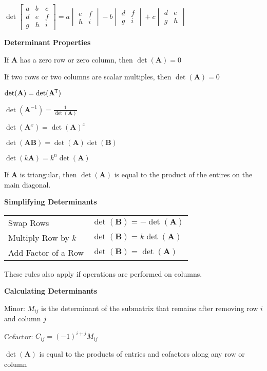 \documentclass[10pt]{article}
\newcommand{\matr}[1]{\mathbf{#1}}
\newcommand{\tran}{^{\mkern-1.5mu\mathsf{T}}}
\newcommand{\inv}{^{-1}}
\newcommand\heading[1]{\medskip\textbf{#1}\medskip}
\begin{document}
\begin{multicols*}{3}
$\det\begin{bmatrix}
    a & b & c \\
    d & e & f \\
    g & h & i
\end{bmatrix} = a\begin{vmatrix}
    e & f \\ 
    h & i
\end{vmatrix} - b\begin{vmatrix}
    d & f \\
    g & i
\end{vmatrix} + c\begin{vmatrix}
    d & e \\
    g & h
\end{vmatrix}$

\heading{Determinant Properties}

If $\matr{A}$ has a zero row or zero column, then $\det(\matr{A})=0$

If two rows or two columns are scalar multiples, then $\det(\matr{A})=0$

$\det(\matr{A})=\det(\matr{A}\tran)$

$\det(\matr{A}\inv)=\frac{1}{\det(\matr{A})}$

$\det(\matr{A}^x)=\det(\matr{A})^x$

$\det(\matr{A}\matr{B})=\det(\matr{A})\det(\matr{B})$

$\det(k\matr{A})=k^n\det(\matr{A})$

If $\matr{A}$ is triangular, then $\det(\matr{A})$ is equal to the product of the entires on the main diagonal.

\heading{Simplifying Determinants}

\begin{tabular}{@{}ll}
    Swap Rows & $\det(\matr{B})=-\det(\matr{A})$ \\
    Multiply Row by $k$ & $\det(\matr{B})=k\det(\matr{A})$ \\
    Add Factor of a Row & $\det(\matr{B})=\det(\matr{A})$
\end{tabular}

These rules also apply if operations are performed on columns.

\heading{Calculating Determinants}

Minor: $M_{ij}$ is the determinant of the submatrix that remains after removing row $i$ and column $j$

Cofactor: $C_{ij}=(-1)^{i+j}M_{ij}$

$\det(\matr{A})$ is equal to the products of entries and cofactors along any row or column


\end{multicols*}
\end{document}
